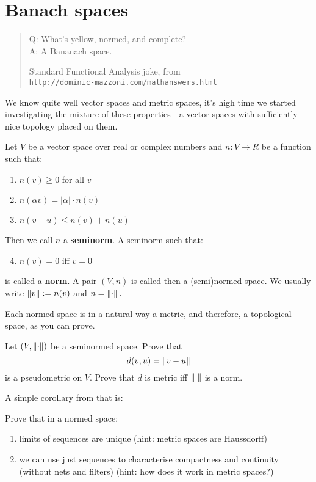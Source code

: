\chapter{Banach spaces}
\label{Banach_spaces}

\begin{quote}
  Q: What's yellow, normed, and complete?\\
  A: A Bananach space.

  Standard Functional Analysis joke, from\\
  \texttt{http://dominic-mazzoni.com/mathanswers.html}
\end{quote}

We know quite well vector spaces and metric spaces, it's high time we started investigating
the mixture of these properties - a vector spaces with sufficiently nice topology placed on them.

\begin{definition}
  Let $V$ be a vector space over real or complex numbers and $n: V\to R$ be a function such that:
  \begin{enumerate}
    \item $n(v)\ge 0$ for all $v$
    \item $n(\alpha v)=|\alpha|\cdot n(v)$
    \item $n(v+u)\le n(v)+n(u)$
  \end{enumerate}
  Then we call $n$ a \textbf{seminorm}. A seminorm such that:
  \begin{enumerate}
  \setcounter{enumi}{3}
    \item $n(v)=0$ iff $v=0$
  \end{enumerate}
  is called a \textbf{norm}. A pair $(V,n)$ is called then a (semi)normed space. We usually write $\left\lVert v\right\rVert := n(v)$ and $n=\left\lVert\cdot\right\rVert.$
\end{definition}

Each normed space is in a natural way a metric, and therefore, a topological space, as you can prove.

\begin{exercise}
  Let $(V, \left\lVert\cdot\right\rVert)$ be a seminormed space. Prove that $$d(v,u)=\left\lVert v-u\right\rVert$$ is a pseudometric on $V$.
  Prove that $d$ is metric iff $\left\lVert\cdot\right\rVert$ is a norm.
\end{exercise}

A simple corollary from that is:

\begin{exercise}
  Prove that in a normed space:
  \begin{enumerate}
    \item limits of sequences are unique (hint: metric spaces are Haussdorff)
    \item we can use just sequences to characterise compactness and continuity (without nets and filters) (hint: how does it work in metric spaces?)
  \end{enumerate}
\end{exercise}

